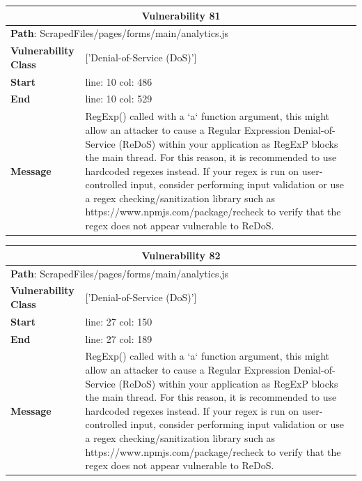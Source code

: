 \documentclass[12pt]{article}
\begin{document}
\vspace{0.7cm}
\FloatBarrier
\begin{table}[!h]
\centering
\renewcommand{\arraystretch}{1.3}
\begin{tabular}{|l|p{10cm}|}
\hline
\multicolumn{2}{|c|}{\textbf{Vulnerability 81}} \\
\hline
\multicolumn{2}{|l|}{\textbf{Path}: ScrapedFiles/pages/forms/main/analytics.js} \\
\hline
\textbf{Vulnerability Class} & ['Denial-of-Service (DoS)'] \\
\hline
\textbf{Start} & line: 10 \quad col: 486 \\
\hline
\textbf{End} & line: 10 \quad col: 529 \\
\hline
\textbf{Message} & RegExp() called with a `a` function argument, this might allow an attacker to cause a Regular Expression Denial-of-Service (ReDoS) within your application as RegExP blocks the main thread. For this reason, it is recommended to use hardcoded regexes instead. If your regex is run on user-controlled input, consider performing input validation or use a regex checking/sanitization library such as https://www.npmjs.com/package/recheck to verify that the regex does not appear vulnerable to ReDoS. \\
\hline
\end{tabular}
\end{table}
\vspace{0.7cm}
\FloatBarrier
\begin{table}[!h]
\centering
\renewcommand{\arraystretch}{1.3}
\begin{tabular}{|l|p{10cm}|}
\hline
\multicolumn{2}{|c|}{\textbf{Vulnerability 82}} \\
\hline
\multicolumn{2}{|l|}{\textbf{Path}: ScrapedFiles/pages/forms/main/analytics.js} \\
\hline
\textbf{Vulnerability Class} & ['Denial-of-Service (DoS)'] \\
\hline
\textbf{Start} & line: 27 \quad col: 150 \\
\hline
\textbf{End} & line: 27 \quad col: 189 \\
\hline
\textbf{Message} & RegExp() called with a `a` function argument, this might allow an attacker to cause a Regular Expression Denial-of-Service (ReDoS) within your application as RegExP blocks the main thread. For this reason, it is recommended to use hardcoded regexes instead. If your regex is run on user-controlled input, consider performing input validation or use a regex checking/sanitization library such as https://www.npmjs.com/package/recheck to verify that the regex does not appear vulnerable to ReDoS. \\
\hline
\end{tabular}
\end{table}
\end{document}
